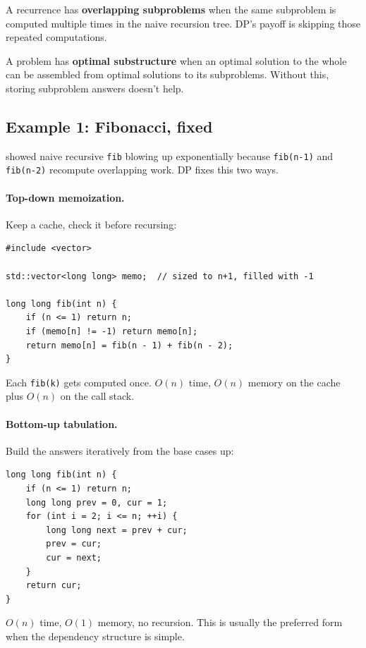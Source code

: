 \documentclass[11pt]{article}
\begin{document}
\begin{defnbox}
A recurrence has \textbf{overlapping subproblems} when the same
subproblem is computed multiple times in the naive recursion tree.
DP's payoff is skipping those repeated computations.
\end{defnbox}

\begin{defnbox}
A problem has \textbf{optimal substructure} when an optimal solution
to the whole can be assembled from optimal solutions to its
subproblems. Without this, storing subproblem answers doesn't help.
\end{defnbox}

\subsection{Example 1: Fibonacci, fixed}

 showed naive recursive \texttt{fib} blowing up
exponentially because \texttt{fib(n-1)} and \texttt{fib(n-2)}
recompute overlapping work. DP fixes this two ways.

\paragraph{Top-down memoization.} Keep a cache, check it before
recursing:

\begin{examplebox}
\begin{verbatim}
#include <vector>

std::vector<long long> memo;  // sized to n+1, filled with -1

long long fib(int n) {
    if (n <= 1) return n;
    if (memo[n] != -1) return memo[n];
    return memo[n] = fib(n - 1) + fib(n - 2);
}
\end{verbatim}
Each \texttt{fib(k)} gets computed once. $O(n)$ time, $O(n)$ memory
on the cache plus $O(n)$ on the call stack.
\end{examplebox}

\paragraph{Bottom-up tabulation.} Build the answers iteratively from
the base cases up:

\begin{examplebox}
\begin{verbatim}
long long fib(int n) {
    if (n <= 1) return n;
    long long prev = 0, cur = 1;
    for (int i = 2; i <= n; ++i) {
        long long next = prev + cur;
        prev = cur;
        cur = next;
    }
    return cur;
}
\end{verbatim}
$O(n)$ time, $O(1)$ memory, no recursion. This is usually the
preferred form when the dependency structure is simple.
\end{examplebox}
\end{document}
